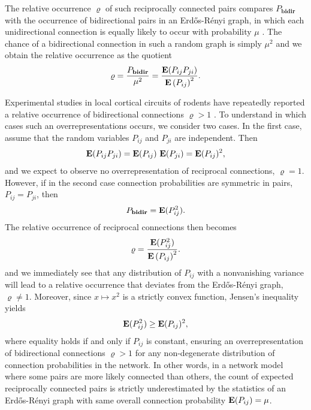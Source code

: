 The relative occurrence $\varrho$ of such reciprocally connected pairs compares $P_{\mathbf{bidir}}$ with the occurrence of bidirectional pairs in an Erd\H{o}s-R\'{e}nyi graph, in which each unidirectional connection is equally likely to occur with probability $\mu$ \cite{Gilbert1959, Erdos1959}. The chance of a bidirectional connection in such a random graph is simply $\mu^2$ and we obtain the relative occurrence as the quotient
\begin{align}
\varrho = \frac{P_{\mathbf{bidir}}}{\mu^2} = \frac{\operatorname{\mathbf{E}}(P_{ij}P_{ji})}{{\operatorname{\mathbf{E}}\left(P_{ij}\right)}^2}.
\end{align}

Experimental studies in local cortical circuits of rodents have repeatedly reported a relative occurrence of bidirectional connections $\varrho > 1$ \cite{Markram1997, Song2005, Perin2011}. To understand in which cases such an overrepresentations occurs, we consider two cases. In the first case, assume that the random variables $P_{ij}$ and $P_{ji}$ are independent. Then
\begin{align}
\operatorname{\mathbf{E}}(P_{ij} P_{ji}) = \operatorname{\mathbf{E}}(P_{ij})\,\operatorname{\mathbf{E}}(P_{ji}) = \operatorname{\mathbf{E}}(P_{ij})^2,
\end{align}
and we expect to observe no overrepresentation of reciprocal connections, $\varrho = 1$. However, if in the second case connection probabilities are symmetric in pairs, $P_{ij} = P_{ji}$, then 
\begin{align}
P_{\mathbf{bidir}} = \operatorname{\mathbf{E}}(P_{ij}^2).
\end{align}
%
The relative occurrence of reciprocal connections then becomes
\begin{align}
\varrho = \frac{\operatorname{\mathbf{E}}(P_{ij}^2)}{{\operatorname{\mathbf{E}}\left(P_{ij}\right)}^2}.
\end{align}
and we immediately see that any distribution of $P_{ij}$ with a nonvanishing variance will lead to a relative occurrence that deviates from the Erd\H{o}s-R\'{e}nyi graph, $\varrho \neq 1$. Moreover, since $x \mapsto x^2$ is a strictly convex function, Jensen's inequality yields
\begin{align}
\operatorname{\mathbf{E}}(P_{ij}^2) \geq \operatorname{\mathbf{E}}(P_{ij})^2,
\end{align}
where equality holds if and only if $P_{ij}$ is constant, ensuring an overrepresentation of bidirectional connections $\varrho > 1$ for any non-degenerate distribution of connection probabilities in the network. In other words, in a network model where some pairs are more likely connected than others, the count of expected reciprocally connected pairs is strictly underestimated by the statistics of an Erd\H{o}s-R\'{e}nyi graph with same overall connection probability $\operatorname{\mathbf{E}}(P_{ij}) = \mu$.





